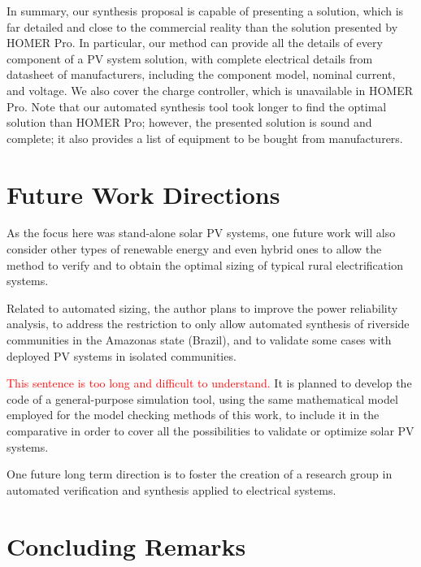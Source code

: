 In summary, our synthesis proposal is capable of presenting a solution, which is far detailed and close to the commercial reality than the solution presented by HOMER Pro. In particular, our method can provide all the details of every component of a PV system solution, with complete electrical details from datasheet of manufacturers, including the component model, nominal current, and voltage. We also cover the charge controller, which is unavailable in HOMER Pro. Note that our automated synthesis tool took longer to find the optimal solution than HOMER Pro; however, the presented solution is sound and complete; it also provides a list of equipment to be bought from manufacturers. %


\section{Future Work Directions}

As the focus here was stand-alone solar PV systems, one future work will also consider other types of renewable energy and even hybrid ones to allow the method to verify and to obtain the optimal sizing of typical rural electrification systems.

Related to automated sizing, the author plans to improve the power reliability analysis, to address the restriction to only allow automated synthesis of riverside communities in the Amazonas state (Brazil), and to validate some cases with deployed PV systems in isolated communities.

\textcolor{red}{This sentence is too long and difficult to understand.}
It is planned to develop the code of a general-purpose simulation tool, using the same mathematical model employed for the model checking methods of this work, to include it in the comparative in order to cover all the possibilities to validate or optimize solar PV systems.

One future long term direction is to foster the creation of a research group in automated verification and synthesis applied to electrical systems.

\section{Concluding Remarks}

